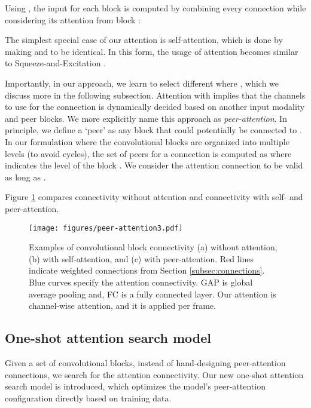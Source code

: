 \documentclass[runningheads]{llncs}
\begin{document}
Using , the input for each block  is computed by combining every connection  while considering its attention from block :

The simplest special case of our attention is self-attention, which is done by making  and  to be identical. In this form, the usage of attention becomes similar to Squeeze-and-Excitation \cite{hu2018squeeze}.

Importantly, in our approach, we learn to select different  where , which we discuss more in the following subsection. Attention with  implies that the channels to use for the connection is dynamically decided based on another input modality and peer blocks. We more explicitly name this approach as \emph{peer-attention}. 
In principle, we define a `peer' as any block  that could potentially be connected to .
In our formulation where the convolutional blocks are organized into multiple levels (to avoid cycles), the set of peers  for a connection  is computed as  where  indicates the level of the block .
We consider the attention connection  to be valid as long as .

Figure \ref{fig:peer-attention} compares connectivity without attention and connectivity with self- and peer-attention.

\begin{figure}
  \centering
  \texttt{[image: figures/peer-attention3.pdf]}
  \caption{Examples of convolutional block connectivity (a) without attention, (b) with self-attention, and (c) with peer-attention. Red lines indicate weighted connections from Section \ref{subsec:connections}.
  Blue curves specify the attention connectivity. GAP is global average pooling and, FC is a fully connected layer. Our attention is channel-wise attention, and it is applied per frame.}
  \label{fig:peer-attention}
\end{figure}



\subsection{One-shot attention search model}
\label{subsec:oneshot}

Given a set of convolutional blocks, instead of hand-designing peer-attention connections, we search for the attention connectivity. Our new one-shot attention search model is introduced, which optimizes the model's peer-attention configuration directly based on training data.
\end{document}
